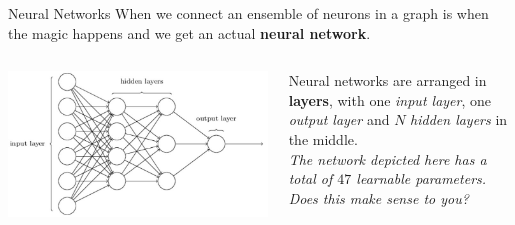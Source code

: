 \documentclass[aspectratio=169]{beamer}
\begin{document}
\begin{frame}{Neural Networks}
When we connect an ensemble of neurons in a graph is when the magic happens and we get an actual \textbf{neural network}.
\vspace{0.5cm}
\begin{columns}
\begin{column}{0.48\textwidth}
\centering
\includegraphics[width=1.0\textwidth]{img/dnn/neural_network.jpg}    \end{column}
\begin{column}{0.48\textwidth}
Neural networks are arranged in \textbf{layers}, with one \textit{input layer}, one \textit{output layer} and $N$ \textit{hidden layers} in the middle.\\
\vspace{0.5cm}
\textit{\small{The network depicted here has a total of $47$ learnable parameters. Does this make sense to you?}}
\end{column}
\end{columns}
\end{frame}

\end{document}
